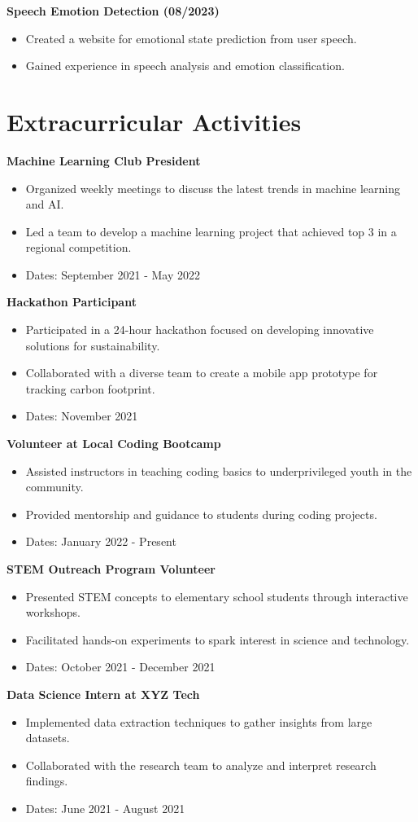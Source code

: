 \documentclass{article}
\begin{document}
\textbf{Speech Emotion Detection (08/2023)}
\begin{itemize}
    \item Created a website for emotional state prediction from user speech.
    \item Gained experience in speech analysis and emotion classification.
\end{itemize}

\section*{Extracurricular Activities}
\textbf{Machine Learning Club President}
\begin{itemize}
    \item Organized weekly meetings to discuss the latest trends in machine learning and AI.
    \item Led a team to develop a machine learning project that achieved top 3 in a regional competition.
    \item Dates: September 2021 - May 2022
\end{itemize}

\textbf{Hackathon Participant}
\begin{itemize}
    \item Participated in a 24-hour hackathon focused on developing innovative solutions for sustainability.
    \item Collaborated with a diverse team to create a mobile app prototype for tracking carbon footprint.
    \item Dates: November 2021
\end{itemize}

\textbf{Volunteer at Local Coding Bootcamp}
\begin{itemize}
    \item Assisted instructors in teaching coding basics to underprivileged youth in the community.
    \item Provided mentorship and guidance to students during coding projects.
    \item Dates: January 2022 - Present
\end{itemize}

\textbf{STEM Outreach Program Volunteer}
\begin{itemize}
    \item Presented STEM concepts to elementary school students through interactive workshops.
    \item Facilitated hands-on experiments to spark interest in science and technology.
    \item Dates: October 2021 - December 2021
\end{itemize}

\textbf{Data Science Intern at XYZ Tech}
\begin{itemize}
    \item Implemented data extraction techniques to gather insights from large datasets.
    \item Collaborated with the research team to analyze and interpret research findings.
    \item Dates: June 2021 - August 2021
\end{itemize}
\end{document}
